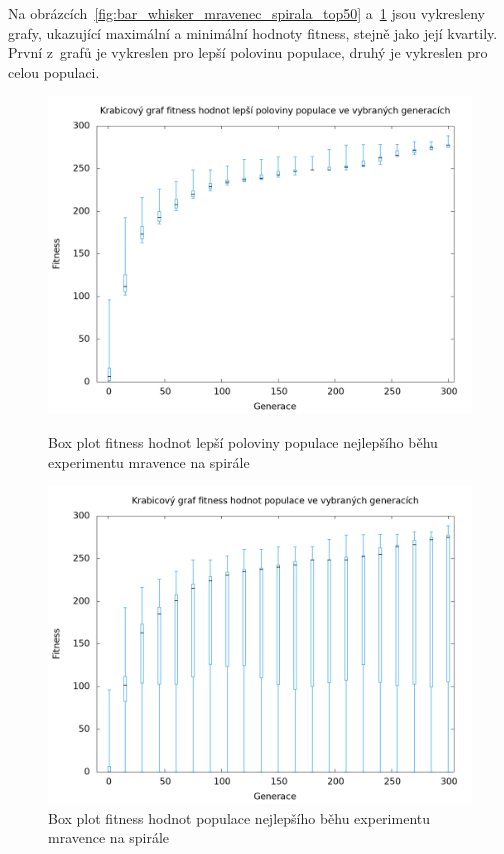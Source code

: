 Na obrázcích~\ref{fig:bar_whisker_mravenec_spirala_top50} a~\ref{fig:bar_whisker_mravenec_spirala} jsou vykresleny grafy, ukazující maximální a minimální hodnoty fitness, stejně jako její kvartily.
První z~grafů je vykreslen pro lepší polovinu populace, druhý je vykreslen pro celou populaci.

\begin{figure}[h]
    \begin{minipage}[c]{0.48\linewidth}
        \includegraphics[width=\linewidth]{obrazky/bar_whisker_mravenec_spirala_top50.png}
        \caption{Box plot fitness hodnot lepší poloviny populace nejlepšího běhu experimentu mravence na spirále}
        \label{fig:bar_whisker_mravenec_spirala_top50}
    \end{minipage}
    \hfill
    \begin{minipage}[c]{0.48\linewidth}
        \includegraphics[width=\linewidth]{obrazky/bar_whisker_mravenec_spirala.png}
        \caption{Box plot fitness hodnot populace nejlepšího běhu experimentu mravence na spirále}
        \label{fig:bar_whisker_mravenec_spirala}
    \end{minipage}
\end{figure}

